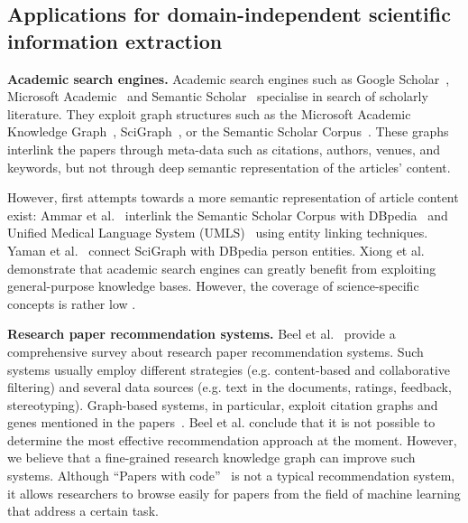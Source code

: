 \documentclass[runningheads]{llncs}
\begin{document}
\subsection{Applications for domain-independent scientific information extraction}
\label{sec:applications}
\textbf{Academic search engines.}
Academic search engines  such as Google Scholar~\cite{GoogleScholar}, Microsoft Academic~\cite{MicrosoftAcademic} and Semantic Scholar~\cite{SemanticScholar}
specialise in search of scholarly literature. 
They exploit graph structures such as the Microsoft Academic Knowledge Graph~\cite{MicrosoftAcademicKG}, SciGraph~\cite{SpringerSciGraph}, or the Semantic Scholar Corpus~\cite{Ammar2018ConstructionOT}.
These graphs interlink the papers through meta-data such as citations, authors, venues, and keywords, but not through deep semantic representation of the articles' content.

However, first attempts towards a more semantic representation of article content exist: Ammar et al.~\cite{Ammar2018ConstructionOT} interlink the Semantic Scholar Corpus with DBpedia~\cite{Lehmann2015DBpediaA} and Unified Medical Language System (UMLS)~\cite{Bodenreider2004TheUM} using entity linking techniques.
Yaman et al.~\cite{Yaman2019InterlinkingSA} connect SciGraph with DBpedia person entities. 
Xiong et al.~\cite{Xiong2017ExplicitSR} demonstrate that academic search engines can greatly benefit from exploiting general-purpose knowledge bases. However, the coverage of science-specific concepts is rather low \cite{Ammar2018ConstructionOT}. 

\textbf{Research paper recommendation systems.}
Beel et al.~\cite{Beel2015ResearchpaperRS} provide a comprehensive survey about research paper recommendation systems. Such systems usually
employ different strategies (e.g. content-based and collaborative filtering) and several data sources (e.g. text in the documents, ratings, feedback, stereotyping).
Graph-based systems, in particular, exploit citation graphs and genes mentioned in the papers~\cite{Lao2010RelationalRU}. 
Beel et al. conclude that it is not possible to determine the most
effective recommendation approach at the moment. However, we believe that a fine-grained research knowledge graph can improve such systems. Although ``Papers with code''~\cite{PWC}  is not a typical recommendation system, it allows researchers to browse easily for papers from the field of machine learning that address a certain task.
\end{document}
